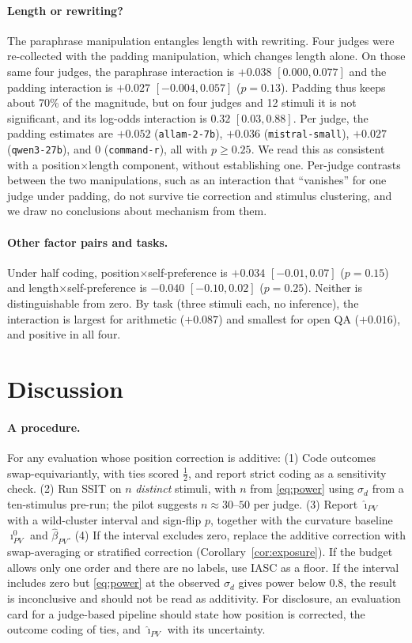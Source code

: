 \documentclass[10pt]{article}
\theoremstyle{remark}
\newcommand{\iPV}{\imath_{PV}}
\newcommand{\hiPV}{\hat\imath_{PV}}
\begin{document}
\paragraph{Length or rewriting?}
The paraphrase manipulation entangles length with rewriting. Four
judges were re-collected with the padding manipulation, which changes
length alone. On those same four judges, the paraphrase interaction is
$+0.038$ $[0.000, 0.077]$ and the padding interaction is $+0.027$
$[-0.004, 0.057]$ ($p=0.13$). Padding thus keeps about 70\% of the
magnitude, but on four judges and 12 stimuli it is not significant, and
its log-odds interaction is $0.32$ $[0.03, 0.88]$. Per judge, the
padding estimates are $+0.052$ (\texttt{allam-2-7b}), $+0.036$
(\texttt{mistral-small}), $+0.027$ (\texttt{qwen3-27b}), and $0$
(\texttt{command-r}), all with $p\geq0.25$. We read this as consistent
with a position$\times$length component, without establishing one.
Per-judge contrasts between the two manipulations, such as an
interaction that ``vanishes'' for one judge under padding, do not
survive tie correction and stimulus clustering, and we draw no
conclusions about mechanism from them.

\paragraph{Other factor pairs and tasks.}
Under half coding, position$\times$self-preference is $+0.034$
$[-0.01, 0.07]$ ($p=0.15$) and length$\times$self-preference is
$-0.040$ $[-0.10, 0.02]$ ($p=0.25$). Neither is distinguishable from
zero. By task (three stimuli each, no inference), the interaction is
largest for arithmetic ($+0.087$) and smallest for open QA ($+0.016$),
and positive in all four.

\section{Discussion}
\label{sec:discussion}

\paragraph{A procedure.}
For any evaluation whose position correction is additive:
(1) Code outcomes swap-equivariantly, with ties scored $\tfrac12$, and
report strict coding as a sensitivity check.
(2) Run SSIT on $n$ \emph{distinct} stimuli, with $n$ from
\eqref{eq:power} using $\sigma_d$ from a ten-stimulus pre-run; the
pilot suggests $n\approx30$--$50$ per judge.
(3) Report $\hiPV$ with a wild-cluster interval and sign-flip $p$,
together with the curvature baseline $\iPV^0$ and $\hat\beta_{PV}$.
(4) If the interval excludes zero, replace the additive correction with
swap-averaging or stratified correction (Corollary~\ref{cor:exposure}).
If the budget allows only one order and there are no labels, use IASC
as a floor. If the interval includes zero but \eqref{eq:power} at the
observed $\sigma_d$ gives power below $0.8$, the result is inconclusive and should not be read as additivity.
For disclosure, an evaluation card for a judge-based pipeline should
state how position is corrected, the outcome coding of ties, and
$\hiPV$ with its uncertainty.
\end{document}

